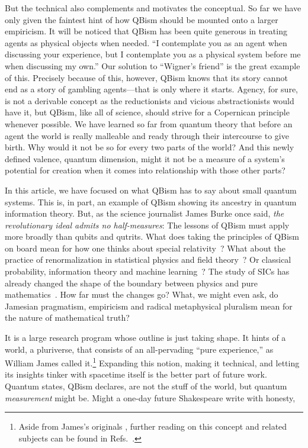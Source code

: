 \documentclass[aps,pra,superscriptaddress,10pt,tightenlines,twocolumn,nofootinbib]{revtex4}
\begin{document}
But the technical also complements and motivates the conceptual.  So far we have only given the faintest hint of how QBism should be mounted onto a larger empiricism.  It will be noticed that QBism has been quite generous in treating agents as physical objects when needed.  ``I contemplate you as an agent when discussing your experience, but I contemplate you as a physical system before me when discussing my own.''  Our solution to ``Wigner's friend'' is the great example of this.  Precisely because of this, however, QBism knows that its story cannot end as a story of gambling agents---that is only where it starts.  Agency, for sure, is not a derivable concept as the reductionists and vicious abstractionists would have it, but QBism, like all of science, should strive for a Copernican principle whenever possible.  We have learned so far from quantum theory that before an agent the world is really malleable and ready through their intercourse to give birth.  Why would it not be so for every two parts of the world?  And this newly defined valence, quantum dimension, might it not be a measure of a system's potential for creation when it comes into relationship with those other parts?

In this article, we have focused on what QBism has to say about small quantum systems.  This is, in part, an example of QBism showing its ancestry in quantum information theory.  But, as the science journalist James Burke once said, {\it the revolutionary ideal admits no half-measures}:  The lessons of QBism must apply more broadly than qubits and qutrits.  What does taking the principles of QBism on board mean for how one thinks about special relativity~\cite{Mermin13}?  What about the practice of renormalization in statistical physics and field theory~\cite{DeBrota16}?  Or classical probability, information theory and machine learning~\cite{Fuchs11, stacey-thesis}?  The study of SICs has already changed the shape of the boundary between physics and pure mathematics~\cite{stacey-hoggar, RCF-SIC, Bengtsson16}.  How far must the changes go?  What, we might even ask, do Jamesian pragmatism, empiricism and radical metaphysical pluralism mean for the nature of mathematical truth?

It is a large research program whose outline is just taking shape.  It hints of a world, a pluriverse, that consists of an all-pervading ``pure experience,'' as William James called it.\footnote{Aside from James's originals \cite{James96a,James96b}, further reading on this concept and related subjects can be found in Refs.~\cite{Lamberth99,Taylor96,Wild69,Gieser05,Russell08,Banks03,Heidelberger04}.}  Expanding this notion, making it technical, and letting its insights tinker with spacetime itself is the better part of future work.  Quantum states, QBism declares, are not the stuff of the world, but quantum {\it measurement\/} might be.  Might a one-day future Shakespeare write with honesty,
\end{document}
